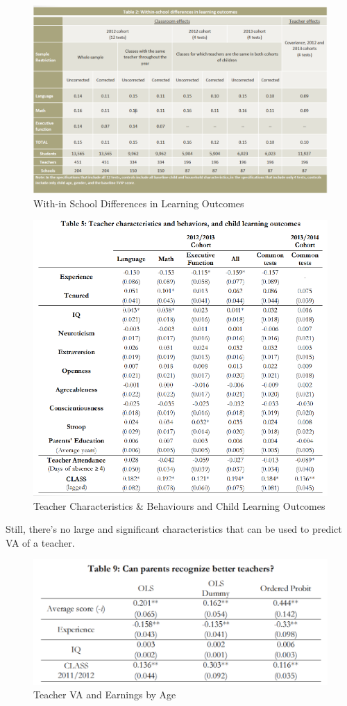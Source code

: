         \begin{figure}[H]
            \centering
            \includegraphics[width=4.5in]{images/ch9/9 Araujo 1.png}
            \caption{With-in School Differences in Learning Outcomes}
        \end{figure}
        \begin{figure}[H]
            \centering
            \includegraphics[width=4.5in]{images/ch9/9 Araujo 2.png}
            \caption{Teacher Characteristics \& Behaviours and Child Learning Outcomes}
        \end{figure}
        Still, there's no large and significant characteristics that can be used to predict VA of a teacher.
        \begin{figure}[H]
            \centering
            \includegraphics[width=4.5in]{images/ch9/9 Araujo 3.png}
            \caption{Teacher VA and Earnings by Age}
        \end{figure}
